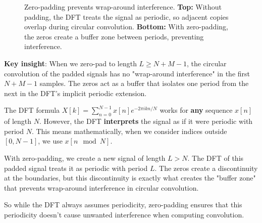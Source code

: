 \begin{notechapter}
\begin{figure}[H]
\caption{Zero-padding prevents wrap-around interference. \textbf{Top:} 
         Without padding, the DFT treats the signal as periodic, so 
         adjacent copies overlap during circular convolution. 
         \textbf{Bottom:} With zero-padding, the zeros create a buffer 
         zone between periods, preventing interference.}
\end{figure}

\textbf{Key insight}: When we zero-pad to length $L \geq N+M-1$, the circular convolution 
of the padded signals has no "wrap-around interference" in the first $N+M-1$ samples. 
The zeros act as a buffer that isolates one period from the next in the DFT's implicit 
periodic extension.

\begin{remark}
The DFT formula $X[k] = \sum_{n=0}^{N-1} x[n] e^{-2\pi i kn/N}$ works for \textbf{any} 
sequence $x[n]$ of length $N$. However, the DFT \textbf{interprets} the signal as if it 
were periodic with period $N$. This means mathematically, when we consider indices outside 
$[0, N-1]$, we use $x[n \mod N]$.

With zero-padding, we create a new signal of length $L > N$. The DFT of this padded signal 
treats it as periodic with period $L$. The zeros create a discontinuity at the boundaries, 
but this discontinuity is exactly what creates the "buffer zone" that prevents wrap-around 
interference in circular convolution.

So while the DFT always assumes periodicity, zero-padding ensures that this periodicity 
doesn't cause unwanted interference when computing convolution.
\end{remark}


\end{notechapter}
